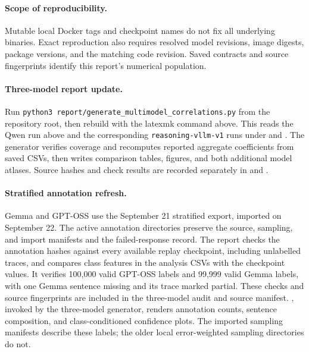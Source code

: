 \paragraph{Scope of reproducibility.}
Mutable local Docker tags and checkpoint names do not fix all underlying
binaries. Exact reproduction also requires resolved model revisions, image
digests, package versions, and the matching code revision. Saved contracts
and source fingerprints identify this report's numerical population.

\paragraph{Three-model report update.}
Run \texttt{python3 report/generate\_multimodel\_correlations.py} from the
repository root, then rebuild with the latexmk command above. This reads
the Qwen run above and the corresponding \texttt{reasoning-vllm-v1} runs
under  and
. The generator verifies
coverage and recomputes reported aggregate coefficients from saved CSVs,
then writes comparison tables, figures, and both additional model atlases.
Source hashes and check results are recorded separately in
 and
.


\paragraph{Stratified annotation refresh.}
Gemma and GPT-OSS use the September 21 stratified export, imported on
September 22. The active annotation directories preserve the source, sampling,
and import manifests and the failed-response record. The report checks the
annotation hashes against every available replay checkpoint, including
unlabelled traces, and compares class features in the analysis CSVs with the
checkpoint values. It verifies 100,000 valid GPT-OSS labels and 99,999 valid
Gemma labels, with one Gemma sentence missing and its trace marked partial.
These checks and source fingerprints are included in the three-model audit
and source manifest. , invoked by the
three-model generator, renders annotation counts, sentence composition, and
class-conditioned confidence plots. The imported sampling manifests describe
these labels; the older local error-weighted sampling directories do not.

